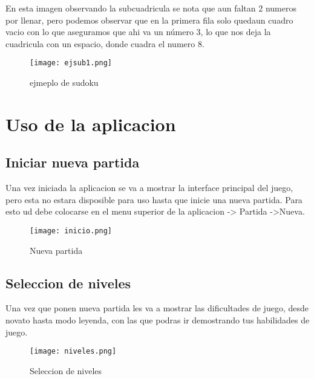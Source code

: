 \documentclass[11pt,fleqn]{book} %
\begin{document}
En esta imagen observando la subcuadricula se nota que aun faltan 2 numeros por llenar, pero podemos observar que en la primera fila solo quedaun cuadro vacio con lo que aseguramos que ahi va un número 3, lo que nos deja la cuadricula con un espacio, donde cuadra el numero 8.

\begin{figure}[h]
\centering\texttt{[image: ejsub1.png]}
\caption{ejmeplo de sudoku}
\end{figure}







\chapter{Uso de la aplicacion}

\section{Iniciar nueva partida}

Una vez iniciada la aplicacion se va a mostrar la interface principal del juego, pero esta no estara disposible para uso hasta que inicie una nueva partida.
Para esto ud debe colocarse en el menu superior de la aplicacion -> Partida ->Nueva.


\begin{figure}[H]
\centering\texttt{[image: inicio.png]}
\caption{Nueva partida}
\end{figure}


\section{Seleccion de niveles}

Una vez que ponen nueva partida les va a mostrar las dificultades de juego, desde novato hasta modo leyenda, con las que podras ir demostrando tus habilidades de juego.

\begin{figure}[H]
\centering\texttt{[image: niveles.png]}
\caption{Seleccion de niveles}
\end{figure}
\end{document}
